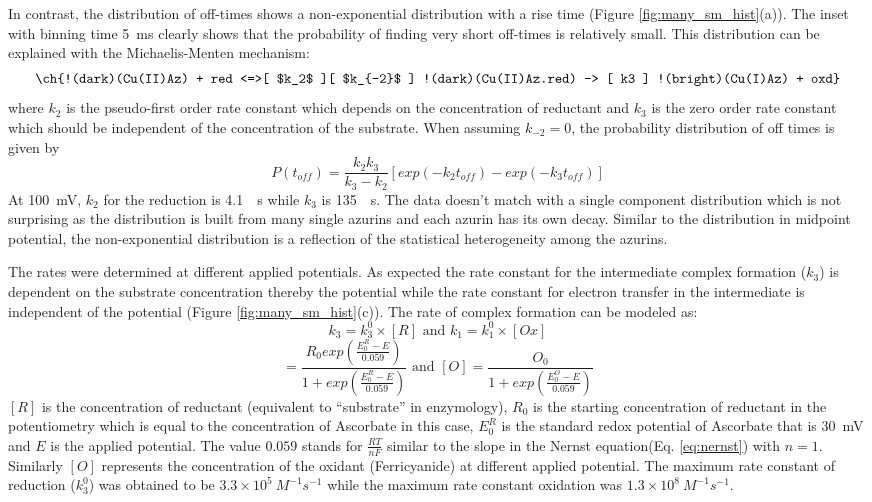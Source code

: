 \documentclass[journal=jacsat,manuscript=article]{achemso}
\begin{document}
In contrast, the distribution of off-times shows a non-exponential distribution with a rise time (Figure \ref{fig:many_sm_hist}(a)).
The inset with binning time \SI{5}{\ms} clearly shows that the probability of finding very short off-times is relatively small.
This distribution can be explained with the Michaelis-Menten mechanism:
\begin{align}
	\ch{!(dark)(Cu(II)Az) + red <=>[ $k_2$ ][ $k_{-2}$ ] !(dark)(Cu(II)Az.red) -> [ k3 ] !(bright)(Cu(I)Az) + oxd}
	\label{eq:reduction}
\end{align}
where $k_2$ is the pseudo-first order rate constant which depends on the concentration of reductant and $k_3$ is the zero order rate constant which should be independent of the concentration of the substrate.
When assuming $k_{-2}=0$, the probability distribution of off times is given by\cite{lu1998single-molecule}
\begin{equation}
	P(t_{off}) = \frac{k_2k_3}{k_3-k_2} [exp(-k_2t_{off})-exp(-k_3t_{off})]
	\label{eq:2exp_risetime}
\end{equation}
At \SI{100}{\mV}, $k_2$ for the reduction is \SI{4.1}{\per\s} while $k_3$ is \SI{135}{\per\s}.
The data doesn't match with a single component distribution which is not surprising as the distribution is built from many single azurins and each azurin has its own decay.
Similar to the distribution in midpoint potential, the non-exponential distribution is a reflection of the statistical heterogeneity among the azurins.

The rates were determined at different applied potentials.
As expected the rate constant for the intermediate complex formation ($k_3$) is dependent on the substrate concentration thereby the potential while the rate constant for electron transfer in the intermediate is independent of the potential (Figure \ref{fig:many_sm_hist}(c)).
The rate of complex formation can be modeled as:
\begin{equation}
	k_3 =k_3^0\times[R] \text{ and } k_1 =k_1^0\times[Ox]
	\label{eq:rate_complex}
\end{equation}
\begin{equation}
	[R] = \frac{R_0exp(\frac{E_0^R-E}{0.059})}{1+exp(\frac{E_0^R-E}{0.059})}
	\text{ and } [O] = \frac{O_0}{1+exp(\frac{E_0^O-E}{0.059})}
	\label{eq:conc_potential}
\end{equation}
$[R]$ is the concentration of reductant (equivalent to ``substrate'' in enzymology), $R_0$ is the starting concentration of reductant in the potentiometry which is equal to the concentration of Ascorbate in this case, $E_0^R$ is the standard redox potential of Ascorbate that is \SI{30}{\mV} and $E$ is the applied potential. The value $0.059$ stands for $\frac{RT}{nF}$ similar to the slope in the Nernst equation(Eq. \ref{eq:nernst}) with $n=1$.
Similarly $[O]$ represents the concentration of the oxidant (Ferricyanide) at different applied potential.
The maximum rate constant of reduction ($k_3^0$) was obtained to be $3.3\times10^5~M^{-1}s^{-1}$ while the maximum rate constant oxidation was $1.3\times10^8~M^{-1}s^{-1}$.
\end{document}

